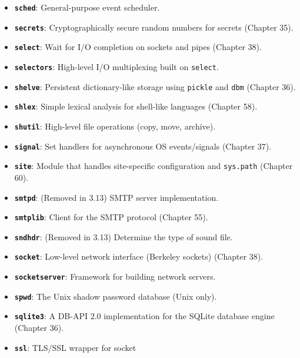 \begin{itemize}
\tightlist
\item
  \textbf{\passthrough{\lstinline!sched!}}: General-purpose event
  scheduler.
\item
  \textbf{\passthrough{\lstinline!secrets!}}: Cryptographically secure
  random numbers for secrets (Chapter 35).
\item
  \textbf{\passthrough{\lstinline!select!}}: Wait for I/O completion on
  sockets and pipes (Chapter 38).
\item
  \textbf{\passthrough{\lstinline!selectors!}}: High-level I/O
  multiplexing built on \passthrough{\lstinline!select!}.
\item
  \textbf{\passthrough{\lstinline!shelve!}}: Persistent dictionary-like
  storage using \passthrough{\lstinline!pickle!} and
  \passthrough{\lstinline!dbm!} (Chapter 36).
\item
  \textbf{\passthrough{\lstinline!shlex!}}: Simple lexical analysis for
  shell-like languages (Chapter 58).
\item
  \textbf{\passthrough{\lstinline!shutil!}}: High-level file operations
  (copy, move, archive).
\item
  \textbf{\passthrough{\lstinline!signal!}}: Set handlers for
  asynchronous OS events/signals (Chapter 37).
\item
  \textbf{\passthrough{\lstinline!site!}}: Module that handles
  site-specific configuration and \passthrough{\lstinline!sys.path!}
  (Chapter 60).
\item
  \textbf{\passthrough{\lstinline!smtpd!}}: (Removed in 3.13) SMTP
  server implementation.
\item
  \textbf{\passthrough{\lstinline!smtplib!}}: Client for the SMTP
  protocol (Chapter 55).
\item
  \textbf{\passthrough{\lstinline!sndhdr!}}: (Removed in 3.13) Determine
  the type of sound file.
\item
  \textbf{\passthrough{\lstinline!socket!}}: Low-level network interface
  (Berkeley sockets) (Chapter 38).
\item
  \textbf{\passthrough{\lstinline!socketserver!}}: Framework for
  building network servers.
\item
  \textbf{\passthrough{\lstinline!spwd!}}: The Unix shadow password
  database (Unix only).
\item
  \textbf{\passthrough{\lstinline!sqlite3!}}: A DB-API 2.0
  implementation for the SQLite database engine (Chapter 36).
\item
  \textbf{\passthrough{\lstinline!ssl!}}: TLS/SSL wrapper for socket

\end{itemize}
